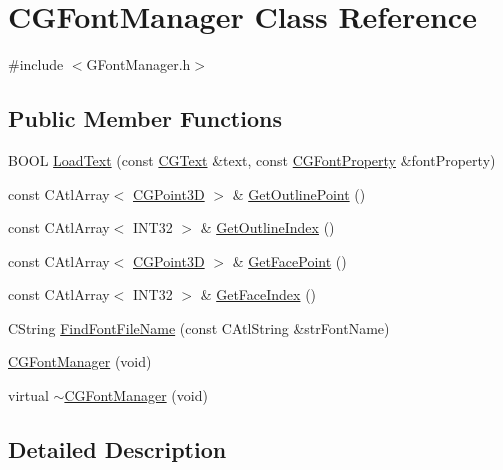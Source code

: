 \hypertarget{class_c_g_font_manager}{}\section{C\+G\+Font\+Manager Class Reference}
\label{class_c_g_font_manager}


{\ttfamily \#include $<$G\+Font\+Manager.\+h$>$}

\subsection*{Public Member Functions}
\begin{DoxyCompactItemize}
\item 
B\+O\+O\+L \hyperlink{class_c_g_font_manager_aff72f32c3a5ad244cd85bd6bd38d733b}{Load\+Text} (const \hyperlink{class_c_g_text}{C\+G\+Text} \&text, const \hyperlink{class_c_g_font_property}{C\+G\+Font\+Property} \&font\+Property)
\item 
const C\+Atl\+Array$<$ \hyperlink{class_c_g_point3_d}{C\+G\+Point3\+D} $>$ \& \hyperlink{class_c_g_font_manager_a72a862b1c89cbfb34f782d290148a266}{Get\+Outline\+Point} ()
\item 
const C\+Atl\+Array$<$ I\+N\+T32 $>$ \& \hyperlink{class_c_g_font_manager_ade2116043bda71a25835563fbb2ebce0}{Get\+Outline\+Index} ()
\item 
const C\+Atl\+Array$<$ \hyperlink{class_c_g_point3_d}{C\+G\+Point3\+D} $>$ \& \hyperlink{class_c_g_font_manager_a84fd8bbc47cb364348c43310e24c5b5a}{Get\+Face\+Point} ()
\item 
const C\+Atl\+Array$<$ I\+N\+T32 $>$ \& \hyperlink{class_c_g_font_manager_a5cb3d7deb7a594c567bc9a92444d9fd3}{Get\+Face\+Index} ()
\item 
C\+String \hyperlink{class_c_g_font_manager_abb189c294af28f813fa70000ee885c4d}{Find\+Font\+File\+Name} (const C\+Atl\+String \&str\+Font\+Name)
\item 
\hyperlink{class_c_g_font_manager_a5c3233acad13749c88baddc6d678c5bd}{C\+G\+Font\+Manager} (void)
\item 
virtual \hyperlink{class_c_g_font_manager_a0435c7b0f13e86e90d2ed33245627152}{$\sim$\+C\+G\+Font\+Manager} (void)
\end{DoxyCompactItemize}


\subsection{Detailed Description}

